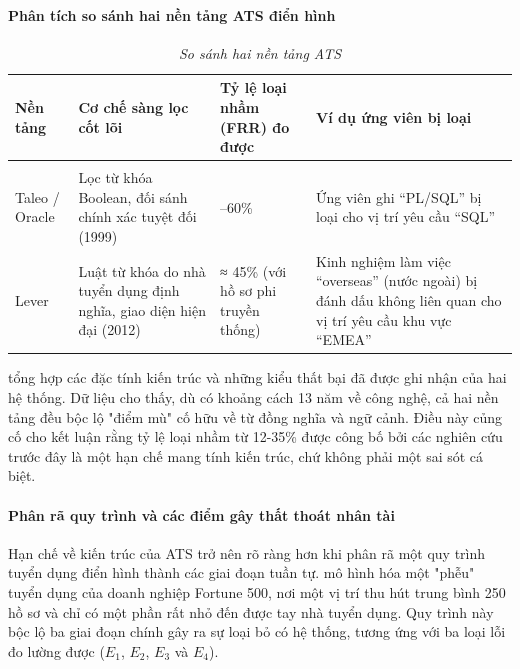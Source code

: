 \documentclass{article}
\begin{document}
\paragraph{Phân tích so sánh hai nền tảng ATS điển hình}
\begin{longtable}{|
  >{\raggedright\arraybackslash}p{}|
  >{\raggedright\arraybackslash}p{}|
  >{\raggedright\arraybackslash}p{}|
  >{\raggedright\arraybackslash}p{}|}
  \hline
  \textbf{Nền tảng} & 
  \textbf{Cơ chế sàng lọc cốt lõi} & 
  \textbf{Tỷ lệ loại nhầm (FRR) đo được} & 
  \textbf{Ví dụ ứng viên bị loại} \\
  \hline
  \endfirsthead

  \endhead

  \hline
  \endfoot

  \hline
  \caption{\textit{So sánh hai nền tảng ATS}} \\
  \endlastfoot

  Taleo / Oracle & 
  Lọc từ khóa Boolean, đối sánh chính xác tuyệt đối (1999) & 
  40–60\% & 
  Ứng viên ghi “PL/SQL” bị loại cho vị trí yêu cầu “SQL” \\
  \hline

  Lever & 
  Luật từ khóa do nhà tuyển dụng định nghĩa, giao diện hiện đại (2012) & 
  ≈ 45\% (với hồ sơ phi truyền thống) & 
  Kinh nghiệm làm việc “overseas” (nước ngoài) bị đánh dấu không liên quan cho vị trí yêu cầu khu vực “EMEA” \\
  \hline
  
\end{longtable}

\hyperref[tab:ats-comparison]{\color{blue}{Bảng 3.1}} tổng hợp các đặc tính kiến trúc và những kiểu thất bại đã được ghi nhận của hai hệ thống. Dữ liệu cho thấy, dù có khoảng cách 13 năm về công nghệ, cả hai nền tảng đều bộc lộ "điểm mù" cố hữu về từ đồng nghĩa và ngữ cảnh. Điều này củng cố cho kết luận rằng tỷ lệ loại nhầm từ 12-35\% được công bố bởi các nghiên cứu trước đây là một hạn chế mang tính kiến trúc, chứ không phải một sai sót cá biệt.

\paragraph{Phân rã quy trình và các điểm gây thất thoát nhân tài}
Hạn chế về kiến trúc của ATS trở nên rõ ràng hơn khi phân rã một quy trình tuyển dụng điển hình thành các giai đoạn tuần tự. \hyperref[fig:ats-diagram]{\color{blue}{Hình 3.1}} mô hình hóa một "phễu" tuyển dụng của doanh nghiệp Fortune 500, nơi một vị trí thu hút trung bình 250 hồ sơ và chỉ có một phần rất nhỏ đến được tay nhà tuyển dụng. Quy trình này bộc lộ ba giai đoạn chính gây ra sự loại bỏ có hệ thống, tương ứng với ba loại lỗi đo lường được ($E_1$, $E_2$, $E_3$ và $E_4$).
\end{document}
